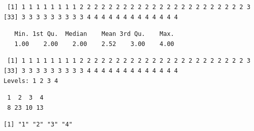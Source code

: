 \documentclass[]{book}
\newenvironment{Shaded}{\begin{snugshade}}{\end{snugshade}}
\newcommand{\KeywordTok}[1]{\textcolor[rgb]{0.13,0.29,0.53}{\textbf{#1}}}
\newcommand{\NormalTok}[1]{#1}
\newcommand{\OperatorTok}[1]{\textcolor[rgb]{0.81,0.36,0.00}{\textbf{#1}}}
\newcommand{\StringTok}[1]{\textcolor[rgb]{0.31,0.60,0.02}{#1}}
\theoremstyle{definition}
\theoremstyle{definition}
\theoremstyle{definition}
\theoremstyle{remark}
\begin{document}
\begin{verbatim}
 [1] 1 1 1 1 1 1 1 1 2 2 2 2 2 2 2 2 2 2 2 2 2 2 2 2 2 2 2 2 2 2 2 3
[33] 3 3 3 3 3 3 3 3 3 4 4 4 4 4 4 4 4 4 4 4 4 4
\end{verbatim}

\begin{Shaded}
\end{Shaded}

\begin{verbatim}
   Min. 1st Qu.  Median    Mean 3rd Qu.    Max. 
   1.00    2.00    2.00    2.52    3.00    4.00 
\end{verbatim}

\begin{Shaded}
\end{Shaded}

\begin{verbatim}
 [1] 1 1 1 1 1 1 1 1 2 2 2 2 2 2 2 2 2 2 2 2 2 2 2 2 2 2 2 2 2 2 2 3
[33] 3 3 3 3 3 3 3 3 3 4 4 4 4 4 4 4 4 4 4 4 4 4
Levels: 1 2 3 4
\end{verbatim}

\begin{Shaded}
\end{Shaded}

\begin{verbatim}
 1  2  3  4 
 8 23 10 13 
\end{verbatim}

\begin{Shaded}
\end{Shaded}

\begin{verbatim}
[1] "1" "2" "3" "4"
\end{verbatim}
\end{document}
